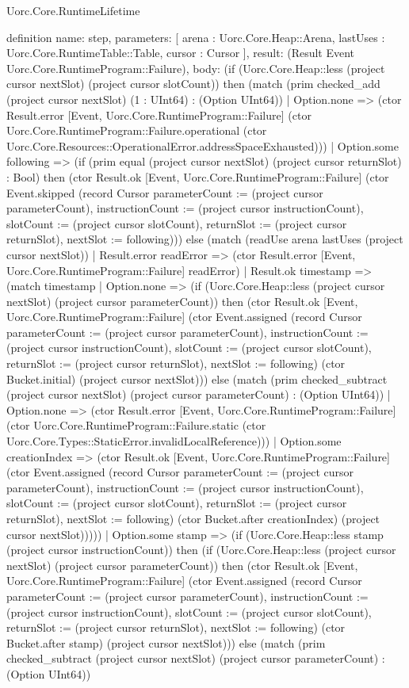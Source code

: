 \begin{lexlean}{Uorc.Core.RuntimeLifetime}
\begin{semanticmodule}
definition{
  name: step,
  parameters: [
    arena : Uorc.Core.Heap::Arena,
    lastUses : Uorc.Core.RuntimeTable::Table,
    cursor : Cursor
  ],
  result: (Result Event Uorc.Core.RuntimeProgram::Failure),
  body: (if (Uorc.Core.Heap::less (project cursor nextSlot) (project cursor slotCount)) then (match (prim checked_add (project cursor nextSlot) (1 : UInt64) : (Option UInt64))
    | Option.none => (ctor Result.error [Event, Uorc.Core.RuntimeProgram::Failure] (ctor Uorc.Core.RuntimeProgram::Failure.operational (ctor Uorc.Core.Resources::OperationalError.addressSpaceExhausted)))
    | Option.some following => (if (prim equal (project cursor nextSlot) (project cursor returnSlot) : Bool) then (ctor Result.ok [Event, Uorc.Core.RuntimeProgram::Failure] (ctor Event.skipped (record Cursor {parameterCount := (project cursor parameterCount), instructionCount := (project cursor instructionCount), slotCount := (project cursor slotCount), returnSlot := (project cursor returnSlot), nextSlot := following}))) else (match (readUse arena lastUses (project cursor nextSlot))
      | Result.error readError => (ctor Result.error [Event, Uorc.Core.RuntimeProgram::Failure] readError)
      | Result.ok timestamp => (match timestamp
        | Option.none => (if (Uorc.Core.Heap::less (project cursor nextSlot) (project cursor parameterCount)) then (ctor Result.ok [Event, Uorc.Core.RuntimeProgram::Failure] (ctor Event.assigned (record Cursor {parameterCount := (project cursor parameterCount), instructionCount := (project cursor instructionCount), slotCount := (project cursor slotCount), returnSlot := (project cursor returnSlot), nextSlot := following}) (ctor Bucket.initial) (project cursor nextSlot))) else (match (prim checked_subtract (project cursor nextSlot) (project cursor parameterCount) : (Option UInt64))
          | Option.none => (ctor Result.error [Event, Uorc.Core.RuntimeProgram::Failure] (ctor Uorc.Core.RuntimeProgram::Failure.static (ctor Uorc.Core.Types::StaticError.invalidLocalReference)))
          | Option.some creationIndex => (ctor Result.ok [Event, Uorc.Core.RuntimeProgram::Failure] (ctor Event.assigned (record Cursor {parameterCount := (project cursor parameterCount), instructionCount := (project cursor instructionCount), slotCount := (project cursor slotCount), returnSlot := (project cursor returnSlot), nextSlot := following}) (ctor Bucket.after creationIndex) (project cursor nextSlot)))))
        | Option.some stamp => (if (Uorc.Core.Heap::less stamp (project cursor instructionCount)) then (if (Uorc.Core.Heap::less (project cursor nextSlot) (project cursor parameterCount)) then (ctor Result.ok [Event, Uorc.Core.RuntimeProgram::Failure] (ctor Event.assigned (record Cursor {parameterCount := (project cursor parameterCount), instructionCount := (project cursor instructionCount), slotCount := (project cursor slotCount), returnSlot := (project cursor returnSlot), nextSlot := following}) (ctor Bucket.after stamp) (project cursor nextSlot))) else (match (prim checked_subtract (project cursor nextSlot) (project cursor parameterCount) : (Option UInt64))
}
\end{semanticmodule}
\end{lexlean}
